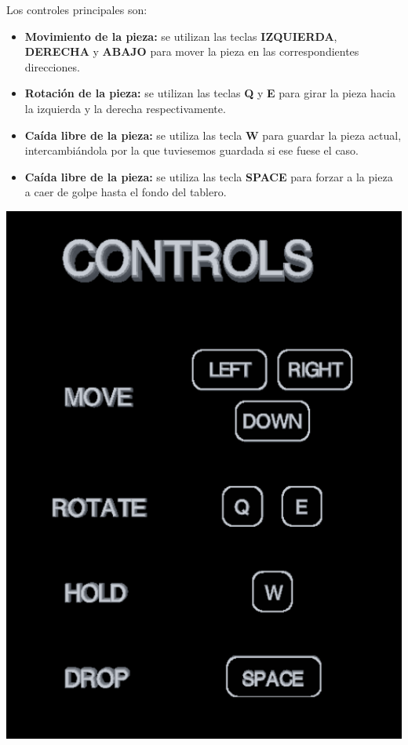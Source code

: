 \documentclass[11pt,a4paper]{article}
\begin{document}
\begin{multicols}{2}

Los controles principales son:

\begin{itemize}
    \item \textbf{Movimiento de la pieza:} se utilizan las teclas \textbf{IZQUIERDA}, \textbf{DERECHA} y \textbf{ABAJO} para mover la pieza en las correspondientes direcciones.
    \item \textbf{Rotación de la pieza:} se utilizan las teclas \textbf{Q} y \textbf{E} para girar la pieza hacia la izquierda y la derecha respectivamente.
    \item \textbf{Caída libre de la pieza:} se utiliza las tecla \textbf{W} para guardar la pieza actual, intercambiándola por la que tuviesemos guardada si ese fuese el caso.
    \item \textbf{Caída libre de la pieza:} se utiliza las tecla \textbf{SPACE} para forzar a la pieza a caer de golpe hasta el fondo del tablero.
\end{itemize}

\includegraphics[scale=0.35]{controles.png}

\end{multicols}
\end{document}

